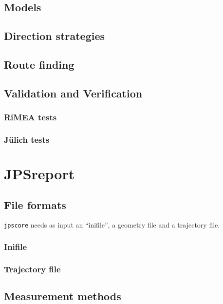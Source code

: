 \documentclass[%
paper=A4,					%
twoside=true,				%
openright,					%
parskip=full,				%
chapterprefix=true,			%
11pt,						%
headings=normal,			%
bibliography=totoc,			%
listof=totoc,				%
titlepage=on,				%
captions=tableabove,		%
draft=false,				%
]{scrreprt}%
\begin{document}
\section{Models}

\newpage
\section{Direction strategies}

\newpage
\section{Route finding}

\newpage
\section{Validation and Verification}
\subsection{RiMEA tests}

\newpage
\subsection{J\"ulich tests}

\chapter{JPSreport}
\section{File formats}
\texttt{jpscore} needs as input an ``inifile'', a geometry file and a trajectory file.

\subsection{Inifile}

\newpage
\subsection{Trajectory file}

\newpage
\section{Measurement methods}
\end{document}
